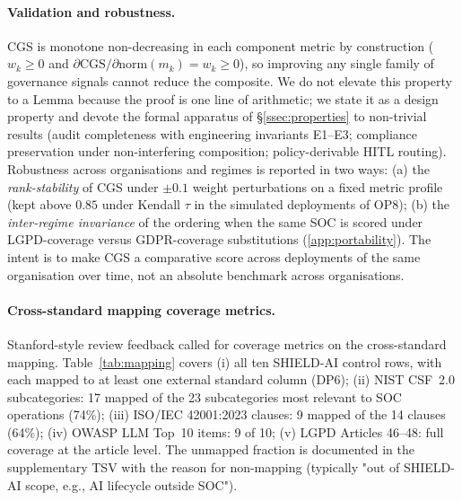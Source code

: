 \documentclass[preprint,12pt,authoryear]{elsarticle}
\begin{document}
\paragraph{Validation and robustness.}
CGS is monotone non-decreasing in each component metric by construction ($w_k \geq 0$ and $\partial \text{CGS}/\partial \text{norm}(m_k) = w_k \geq 0$), so improving any single family of governance signals cannot reduce the composite. We do not elevate this property to a Lemma because the proof is one line of arithmetic; we state it as a design property and devote the formal apparatus of §\ref{ssec:properties} to non-trivial results (audit completeness with engineering invariants E1--E3; compliance preservation under non-interfering composition; policy-derivable HITL routing). Robustness across organisations and regimes is reported in two ways: (a) the \emph{rank-stability} of CGS under $\pm 0.1$ weight perturbations on a fixed metric profile (kept above $0.85$ under Kendall $\tau$ in the simulated deployments of OP8); (b) the \emph{inter-regime invariance} of the ordering when the same SOC is scored under LGPD-coverage versus GDPR-coverage substitutions (\ref{app:portability}). The intent is to make CGS a comparative score across deployments of the same organisation over time, not an absolute benchmark across organisations.

\paragraph{Cross-standard mapping coverage metrics.}
Stanford-style review feedback called for coverage metrics on the cross-standard mapping. Table~\ref{tab:mapping} covers (i) all ten SHIELD-AI control rows, with each mapped to at least one external standard column (DP6); (ii) NIST CSF~2.0 subcategories: 17 mapped of the 23 subcategories most relevant to SOC operations (74\%); (iii) ISO/IEC 42001:2023 clauses: 9 mapped of the 14 clauses (64\%); (iv) OWASP LLM Top~10 items: 9 of 10; (v) LGPD Articles 46--48: full coverage at the article level. The unmapped fraction is documented in the supplementary TSV with the reason for non-mapping (typically "out of SHIELD-AI scope, e.g., AI lifecycle outside SOC").
\end{document}
